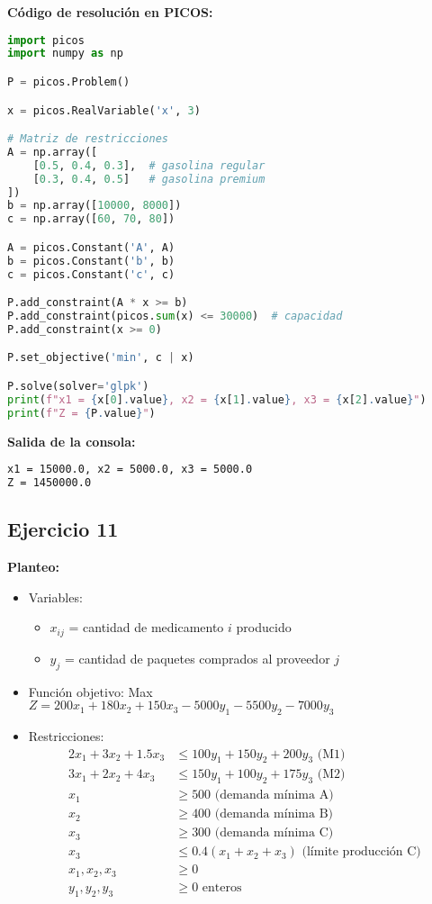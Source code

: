 \documentclass[12pt]{article}
\begin{document}
\begin{enumerate}
\textbf{Código de resolución en PICOS:}
\begin{lstlisting}[language=Python]
import picos
import numpy as np

P = picos.Problem()

x = picos.RealVariable('x', 3)

# Matriz de restricciones
A = np.array([
    [0.5, 0.4, 0.3],  # gasolina regular
    [0.3, 0.4, 0.5]   # gasolina premium
])
b = np.array([10000, 8000])
c = np.array([60, 70, 80])

A = picos.Constant('A', A)
b = picos.Constant('b', b)
c = picos.Constant('c', c)

P.add_constraint(A * x >= b)
P.add_constraint(picos.sum(x) <= 30000)  # capacidad
P.add_constraint(x >= 0)

P.set_objective('min', c | x)

P.solve(solver='glpk')
print(f"x1 = {x[0].value}, x2 = {x[1].value}, x3 = {x[2].value}")
print(f"Z = {P.value}")
\end{lstlisting}

\textbf{Salida de la consola:}
\begin{lstlisting}[language=bash,backgroundcolor=\color{black},basicstyle=\color{white}\ttfamily,numbers=none]
x1 = 15000.0, x2 = 5000.0, x3 = 5000.0
Z = 1450000.0
\end{lstlisting}

\newpage

\subsection*{Ejercicio 11}

\textbf{Planteo:}
\begin{itemize}
\item Variables:
  \begin{itemize}
  \item $x_{ij}$ = cantidad de medicamento $i$ producido
  \item $y_j$ = cantidad de paquetes comprados al proveedor $j$
  \end{itemize}
\item Función objetivo: Max $Z = 200x_1 + 180x_2 + 150x_3 - 5000y_1 - 5500y_2 - 7000y_3$
\item Restricciones:
  \begin{align*}
  2x_1 + 3x_2 + 1.5x_3 &\leq 100y_1 + 150y_2 + 200y_3 \text{ (M1)} \\
  3x_1 + 2x_2 + 4x_3 &\leq 150y_1 + 100y_2 + 175y_3 \text{ (M2)} \\
  x_1 &\geq 500 \text{ (demanda mínima A)} \\
  x_2 &\geq 400 \text{ (demanda mínima B)} \\
  x_3 &\geq 300 \text{ (demanda mínima C)} \\
  x_3 &\leq 0.4(x_1 + x_2 + x_3) \text{ (límite producción C)} \\
  x_1, x_2, x_3 &\geq 0 \\
  y_1, y_2, y_3 &\geq 0 \text{ enteros}
  \end{align*}
\end{itemize}


\end{enumerate}
\end{document}

